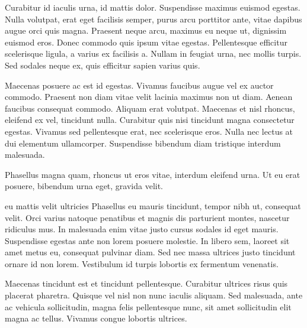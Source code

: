 \documentclass[draft]{article}
\begin{document}
Curabitur id iaculis urna, id mattis dolor.
{Suspendisse maximus euismod egestas. Nulla volutpat, erat eget
  facilisis semper, purus arcu porttitor ante, vitae dapibus augue orci
quis magna.}
Praesent neque arcu, maximus eu neque ut, dignissim euismod eros. Donec commodo
quis ipsum vitae egestas. Pellentesque efficitur scelerisque ligula, a varius ex
facilisis a. Nullam in feugiat urna, nec mollis turpis. Sed sodales neque ex,
quis efficitur sapien varius quis. 

Maecenas posuere ac est id egestas. Vivamus faucibus augue vel ex auctor
commodo.  Praesent non diam vitae
velit lacinia maximus non ut diam. Aenean faucibus consequat commodo. Aliquam
erat volutpat.  Maecenas et nisl rhoncus, eleifend ex vel, tincidunt nulla.
Curabitur quis nisi tincidunt magna consectetur egestas. Vivamus sed
pellentesque erat, nec scelerisque eros. Nulla nec lectus at dui elementum
ullamcorper. Suspendisse bibendum diam tristique interdum malesuada.

Phasellus magna quam, rhoncus ut eros vitae, interdum eleifend urna. Ut eu erat
posuere, bibendum urna eget, gravida velit.
\begin{anfxwarning*}{eu mattis velit ultricies}
  {Phasellus eu mauris tincidunt, tempor nibh ut, consequat velit. Orci varius
  natoque penatibus et magnis dis parturient montes, nascetur ridiculus mus. }
  In malesuada enim vitae justo cursus sodales id eget mauris. Suspendisse
  egestas ante non lorem posuere molestie. In libero sem, laoreet sit amet metus
  eu, consequat pulvinar diam. Sed nec massa ultrices justo tincidunt ornare id
  non lorem. Vestibulum id turpis lobortis ex fermentum venenatis.
\end{anfxwarning*}
Maecenas tincidunt est et tincidunt
pellentesque. Curabitur ultrices risus quis placerat pharetra. Quisque vel nisl
non nunc iaculis aliquam. Sed malesuada, ante ac vehicula sollicitudin, magna
felis pellentesque nunc, sit amet sollicitudin elit magna ac tellus. Vivamus
congue lobortis ultrices.
\end{document}
